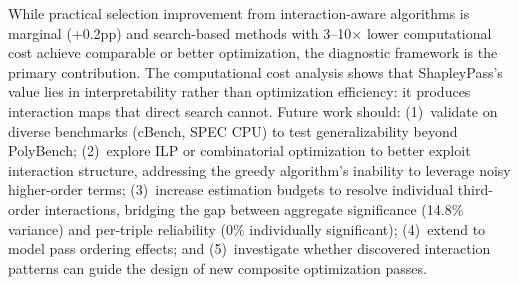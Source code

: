\documentclass[preprint]{article}
\begin{document}
While practical selection improvement from interaction-aware algorithms is marginal (+0.2pp) and search-based methods with 3--10$\times$ lower computational cost achieve comparable or better optimization, the diagnostic framework is the primary contribution. The computational cost analysis shows that ShapleyPass's value lies in interpretability rather than optimization efficiency: it produces interaction maps that direct search cannot. Future work should: (1)~validate on diverse benchmarks (cBench, SPEC CPU) to test generalizability beyond PolyBench; (2)~explore ILP or combinatorial optimization to better exploit interaction structure, addressing the greedy algorithm's inability to leverage noisy higher-order terms; (3)~increase estimation budgets to resolve individual third-order interactions, bridging the gap between aggregate significance (14.8\% variance) and per-triple reliability (0\% individually significant); (4)~extend to model pass ordering effects; and (5)~investigate whether discovered interaction patterns can guide the design of new composite optimization passes.


\end{document}
